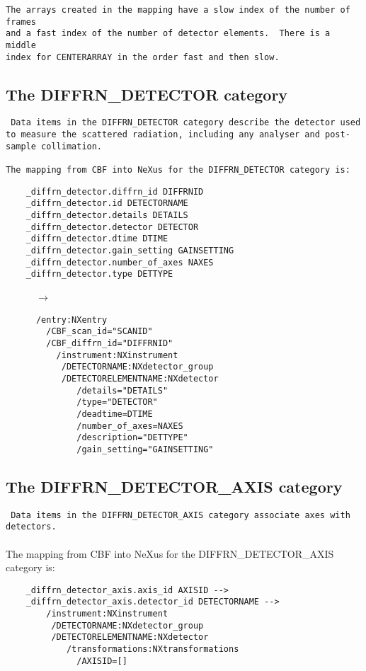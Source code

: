 \documentclass[11pt]{article}
\begin{document}
{{\begin{verbatim}
The arrays created in the mapping have a slow index of the number of frames
and a fast index of the number of detector elements.  There is a middle
index for CENTERARRAY in the order fast and then slow.
\end{verbatim}
}
              


\subsection{The DIFFRN\_DETECTOR category}

{\footnotesize \tt
Data items in the DIFFRN\_DETECTOR category describe the
detector used to measure the scattered radiation, including
any analyser and post-sample collimation.\\
~~\\
The mapping from CBF into NeXus for the DIFFRN\_DETECTOR category is:
}
\begin{verbatim}     
    _diffrn_detector.diffrn_id DIFFRNID
    _diffrn_detector.id DETECTORNAME
    _diffrn_detector.details DETAILS
    _diffrn_detector.detector DETECTOR
    _diffrn_detector.dtime DTIME 
    _diffrn_detector.gain_setting GAINSETTING
    _diffrn_detector.number_of_axes NAXES
    _diffrn_detector.type DETTYPE
\end{verbatim}
~~~~~~{\bf{}$\rightarrow$}\\
\begin{verbatim}
      /entry:NXentry
        /CBF_scan_id="SCANID"      
        /CBF_diffrn_id="DIFFRNID"  
          /instrument:NXinstrument 
           /DETECTORNAME:NXdetector_group
           /DETECTORELEMENTNAME:NXdetector
              /details="DETAILS"
              /type="DETECTOR"
              /deadtime=DTIME
              /number_of_axes=NAXES
              /description="DETTYPE"
              /gain_setting="GAINSETTING"
\end{verbatim}


\subsection{The DIFFRN\_DETECTOR\_AXIS category}

{\footnotesize \tt
Data items in the DIFFRN\_DETECTOR\_AXIS category associate
axes with detectors.\\
}
~~\\
The mapping from CBF into NeXus for the DIFFRN\_DETECTOR\_AXIS category is:

\begin{verbatim}     
    _diffrn_detector_axis.axis_id AXISID -->
    _diffrn_detector_axis.detector_id DETECTORNAME -->
        /instrument:NXinstrument
         /DETECTORNAME:NXdetector_group
         /DETECTORELEMENTNAME:NXdetector
            /transformations:NXtransformations
              /AXISID=[]
    

\end{verbatim}}
\end{document}
